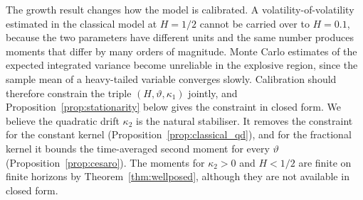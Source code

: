 \begin{table}
\label{tab:growth}
\end{table}

The growth result changes how the model is calibrated. A volatility-of-volatility estimated in the classical model at $H=1/2$ cannot be carried over to $H=0.1$, because the two parameters have different units and the same number produces moments that differ by many orders of magnitude. Monte Carlo estimates of the expected integrated variance become unreliable in the explosive region, since the sample mean of a heavy-tailed variable converges slowly. Calibration should therefore constrain the triple $(H,\vartheta,\kappa_1)$ jointly, and Proposition~\ref{prop:stationarity} below gives the constraint in closed form. We believe the quadratic drift $\kappa_2$ is the natural stabiliser. It removes the constraint for the constant kernel (Proposition~\ref{prop:classical_qd}), and for the fractional kernel it bounds the time-averaged second moment for every $\vartheta$ (Proposition~\ref{prop:cesaro}). The moments for $\kappa_2>0$ and $H<1/2$ are finite on finite horizons by Theorem~\ref{thm:wellposed}, although they are not available in closed form.

